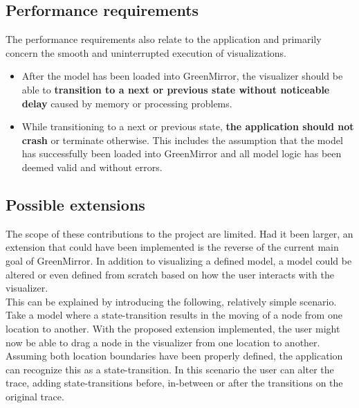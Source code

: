 \documentclass[a4paper]{article}
\begin{document}
\subsection{Performance requirements}
The performance requirements also relate to the application and primarily concern the smooth and uninterrupted execution of visualizations.
\begin{itemize}
\item After the model has been loaded into GreenMirror, the visualizer should be able to \textbf{transition to a next or previous state without noticeable delay} caused by memory or processing problems.
\item While transitioning to a next or previous state, \textbf{the application should not crash} or terminate otherwise. This includes the assumption that the model has successfully been loaded into GreenMirror and all model logic has been deemed valid and without errors.
\end{itemize}


\subsection{Possible extensions}\label{subsec:possibleextensions}
The scope of these contributions to the project are limited. Had it been larger, an extension that could have been implemented is the reverse of the current main goal of GreenMirror. In addition to visualizing a defined model, a model could be altered or even defined from scratch based on how the user interacts with the visualizer.
\\This can be explained by introducing the following, relatively simple scenario. Take a model where a state-transition results in the moving of a node from one location to another. With the proposed extension implemented, the user might now be able to drag a node in the visualizer from one location to another. Assuming both location boundaries have been properly defined, the application can recognize this as a state-transition. In this scenario the user can alter the trace, adding state-transitions before, in-between or after the transitions on the original trace.
\end{document}
